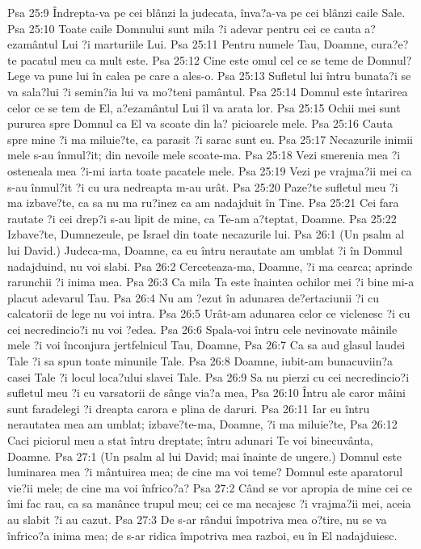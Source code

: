 Psa 25:9  Îndrepta-va pe cei blânzi la judecata, înva?a-va pe cei blânzi caile Sale.
Psa 25:10  Toate caile Domnului sunt mila ?i adevar pentru cei ce cauta a?ezamântul Lui ?i marturiile Lui.
Psa 25:11  Pentru numele Tau, Doamne, cura?e?te pacatul meu ca mult este.
Psa 25:12  Cine este omul cel ce se teme de Domnul? Lege va pune lui în calea pe care a ales-o.
Psa 25:13  Sufletul lui întru bunata?i se va sala?lui ?i semin?ia lui va mo?teni pamântul.
Psa 25:14  Domnul este întarirea celor ce se tem de El, a?ezamântul Lui îl va arata lor.
Psa 25:15  Ochii mei sunt pururea spre Domnul ca El va scoate din la? picioarele mele.
Psa 25:16  Cauta spre mine ?i ma miluie?te, ca parasit ?i sarac sunt eu.
Psa 25:17  Necazurile inimii mele s-au înmul?it; din nevoile mele scoate-ma.
Psa 25:18  Vezi smerenia mea ?i osteneala mea ?i-mi iarta toate pacatele mele.
Psa 25:19  Vezi pe vrajma?ii mei ca s-au înmul?it ?i cu ura nedreapta m-au urât.
Psa 25:20  Paze?te sufletul meu ?i ma izbave?te, ca sa nu ma ru?inez ca am nadajduit în Tine.
Psa 25:21  Cei fara rautate ?i cei drep?i s-au lipit de mine, ca Te-am a?teptat, Doamne.
Psa 25:22  Izbave?te, Dumnezeule, pe Israel din toate necazurile lui.
Psa 26:1  (Un psalm al lui David.) Judeca-ma, Doamne, ca eu întru nerautate am umblat ?i în Domnul nadajduind, nu voi slabi.
Psa 26:2  Cerceteaza-ma, Doamne, ?i ma cearca; aprinde rarunchii ?i inima mea.
Psa 26:3  Ca mila Ta este înaintea ochilor mei ?i bine mi-a placut adevarul Tau.
Psa 26:4  Nu am ?ezut în adunarea de?ertaciunii ?i cu calcatorii de lege nu voi intra.
Psa 26:5  Urât-am adunarea celor ce viclenesc ?i cu cei necredincio?i nu voi ?edea.
Psa 26:6  Spala-voi întru cele nevinovate mâinile mele ?i voi înconjura jertfelnicul Tau, Doamne,
Psa 26:7  Ca sa aud glasul laudei Tale ?i sa spun toate minunile Tale.
Psa 26:8  Doamne, iubit-am bunacuviin?a casei Tale ?i locul loca?ului slavei Tale.
Psa 26:9  Sa nu pierzi cu cei necredincio?i sufletul meu ?i cu varsatorii de sânge via?a mea,
Psa 26:10  Întru ale caror mâini sunt faradelegi ?i dreapta carora e plina de daruri.
Psa 26:11  Iar eu întru nerautatea mea am umblat; izbave?te-ma, Doamne, ?i ma miluie?te,
Psa 26:12  Caci piciorul meu a stat întru dreptate; întru adunari Te voi binecuvânta, Doamne.
Psa 27:1  (Un psalm al lui David; mai înainte de ungere.) Domnul este luminarea mea ?i mântuirea mea; de cine ma voi teme? Domnul este aparatorul vie?ii mele; de cine ma voi înfrico?a?
Psa 27:2  Când se vor apropia de mine cei ce îmi fac rau, ca sa manânce trupul meu; cei ce ma necajesc ?i vrajma?ii mei, aceia au slabit ?i au cazut.
Psa 27:3  De s-ar rândui împotriva mea o?tire, nu se va înfrico?a inima mea; de s-ar ridica împotriva mea razboi, eu în El nadajduiesc.
